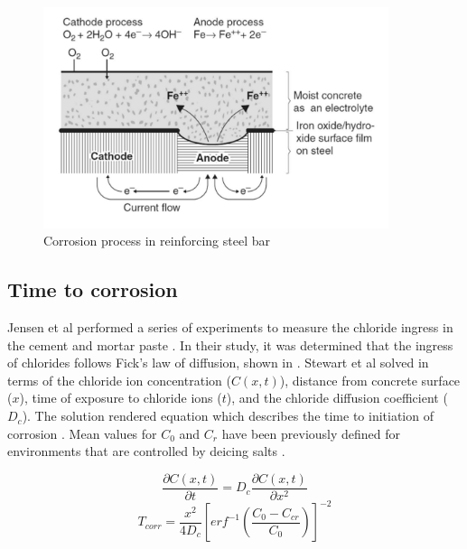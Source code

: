 \begin{figure}[htbp]
\centering
\includegraphics[width=0.9\textwidth]{Chapter-2/figs/Corrosion_Process}
\caption{Corrosion process in reinforcing steel bar \cite{Mehta2014}}
\label{fig:corr1}
\end{figure}

\subsection{Time to corrosion}

 Jensen et al performed a series of experiments to measure the chloride ingress in the cement and mortar paste  \cite{Jensen1999}. In their study, it was determined that the ingress of chlorides follows Fick's law of diffusion, shown in . Stewart et al solved   in terms of the chloride ion concentration ($C(x,t)$), distance from concrete surface ($x$), time of exposure to chloride ions ($t$), and the chloride diffusion coefficient ($D_c$). The solution rendered equation  which describes the time to initiation of corrosion    \cite{Stewart1998}\cite{Y.Liu1998a}\cite{Thoft-Christensen}. Mean values for $C_0$ and $C_r$ have been previously defined for environments that are controlled by deicing salts \cite{Ghosh2010}\cite{Weyers1994}\cite{Enright1998}.

\begin{equation}
	\frac{\partial C(x,t)}{\partial t} = D_c \frac{\partial C(x,t)}{\partial x^2}
	\label{eq:ficks_law}
\end{equation}
\newline
\begin{equation}
  T_{corr}=\frac{x^2}{4 D_c} \left[erf^{-1} \left(\frac{C_0-C_{cr}}{C_0} \right) \right]^{-2}
  \label{eq.three}
\end{equation} 

